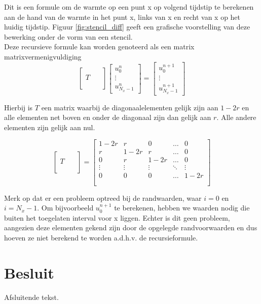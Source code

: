 \documentclass[a4paper,kulak]{kulakarticle} %
\begin{document}
Dit is een formule om de warmte op een punt x op volgend tijdstip te berekenen aan de hand van de warmte in het punt x, links van x en recht van x op het huidig tijdstip. Figuur \ref{fig:stencil_diff} geeft een grafische voorstelling van deze bewerking onder de vorm van een stencil. \\
Deze recursieve formule kan worden genoteerd als een matrix matrixvermenigvuldiging
\begin{equation}
	\begin{bmatrix}
		\qquad \\
		T \\
		\\ 
	\end{bmatrix}
	\begin{bmatrix}
		u_0^n \\
		\vdots \\
		u_{N_x - 1}^n
	\end{bmatrix}
	=
	\begin{bmatrix}
		u_0^{n+1} \\
		\vdots \\
		u_{N_x - 1}^{n+1}
	\end{bmatrix}	
\end{equation}

Hierbij is $T$ een matrix waarbij de diagonaalelementen gelijk zijn aan $1-2r$ en alle elementen net boven en onder de diagonaal zijn dan gelijk aan $r$. Alle andere elementen zijn gelijk aan nul.

\begin{equation}
	\begin{bmatrix}
		\qquad \\
		T \\
		\\ 
	\end{bmatrix}
	=
	\begin{bmatrix}
		1-2r	&	r		&	0		&	\dots	&	0 		\\
		r		&	1-2r	&	r		&	\dots	&	0		\\
		0		&	r		&	1-2r	&	\dots	&	0		\\
		\vdots	&	\vdots	&	\vdots	&	\ddots	&	\vdots	\\
		0		&	0		&	0		&	\dots	&	1-2r	\\
		\\ 
	\end{bmatrix}
\end{equation}

Merk op dat er een probleem optreed bij de randwaarden, waar $i = 0$ en $i = N_x-1$. Om bijvoorbeeld $u_0^{n+1}$ te berekenen, hebben we waarden nodig die buiten het toegelaten interval voor x liggen. Echter is dit geen probleem, aangezien deze elementen gekend zijn door de opgelegde randvoorwaarden en dus hoeven ze niet berekend te worden a.d.h.v. de recursieformule.

\section*{Besluit}

Afsluitende tekst.
\end{document}
